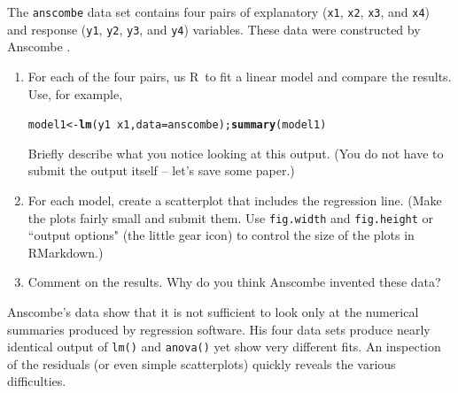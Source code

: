 \documentclass[twoside]{book}\usepackage[]{graphicx}\usepackage[]{xcolor}
\makeatletter
\newcommand{\hlopt}[1]{\textcolor[rgb]{0,0,0}{#1}}%
\newcommand{\hlstd}[1]{\textcolor[rgb]{0.345,0.345,0.345}{#1}}%
\newcommand{\hlkwb}[1]{\textcolor[rgb]{0.69,0.353,0.396}{#1}}%
\newcommand{\hlkwc}[1]{\textcolor[rgb]{0.333,0.667,0.333}{#1}}%
\newcommand{\hlkwd}[1]{\textcolor[rgb]{0.737,0.353,0.396}{\textbf{#1}}}%
\newenvironment{kframe}{%
 \def\at@end@of@kframe{}%
 \ifinner\ifhmode%
  \def\at@end@of@kframe{\end{minipage}}%
  \begin{minipage}{\columnwidth}%
 \fi\fi%
 \def\FrameCommand##1{\hskip\@totalleftmargin \hskip-\fboxsep
 \colorbox{shadecolor}{##1}\hskip-\fboxsep
     \hskip-\linewidth \hskip-\@totalleftmargin \hskip\columnwidth}%
 \MakeFramed {\advance\hsize-\width
   \@totalleftmargin\z@ \linewidth\hsize
   \@setminipage}}%
 {\par\unskip\endMakeFramed%
 \at@end@of@kframe}
\newenvironment{knitrout}{}{} %
\newcommand{\variable}[1]{{\color{green!50!black}\texttt{#1}}}
\newcommand{\Rindex}[1]{\index{\texttt{#1}}}
\newcommand{\dataframe}[1]{{\color{blue!80!black}\texttt{#1}}\Rindex{#1}}
\def\R{{\sf R}}
\newcounter{example}[section]
\makeatother
\begin{document}
\begin{problem}
	The \dataframe{anscombe} data set contains four pairs of explanatory 
	(\variable{x1}, \variable{x2}, \variable{x3}, and \variable{x4})
	and response
	(\variable{y1}, \variable{y2}, \variable{y3}, and \variable{y4})
	variables.  These data were constructed by Anscombe 
	\cite{Anscombe:1973:Graphs}.
	\begin{enumerate}
		\item 
			For each of the four pairs, us \R\ to fit a linear model and 
			compare the results.  Use, for example,
\begin{knitrout}
\color{fgcolor}\begin{kframe}
\begin{alltt}
\hlstd{model1} \hlkwb{<-} \hlkwd{lm}\hlstd{(y1} \hlopt{~} \hlstd{x1,} \hlkwc{data} \hlstd{= anscombe);} \hlkwd{summary}\hlstd{(model1)}
\end{alltt}
\end{kframe}
\end{knitrout}
			Briefly describe what you notice looking at this output.  (You do not have
			to submit the output itself -- let's save some paper.)
		\item
			For each model, create a scatterplot that includes the regression line.
			(Make the plots fairly small and submit them.
			Use \texttt{fig.width} and \texttt{fig.height} or ``output options" (the little gear icon)
			to control the size of the plots in RMarkdown.)
		\item
			Comment on the results.  Why do you think Anscombe invented these data?
	\end{enumerate}
\end{problem}

\begin{solution}
  Anscombe's data show that it is not sufficient to look only at the 
  numerical summaries produced by regression software.  His four data
  sets produce nearly identical output of \verb!lm()! and \verb!anova()!
  yet show very different fits.  An inspection of the residuals (or even
  simple scatterplots) quickly reveals the various difficulties.
\end{solution}
\end{document}

